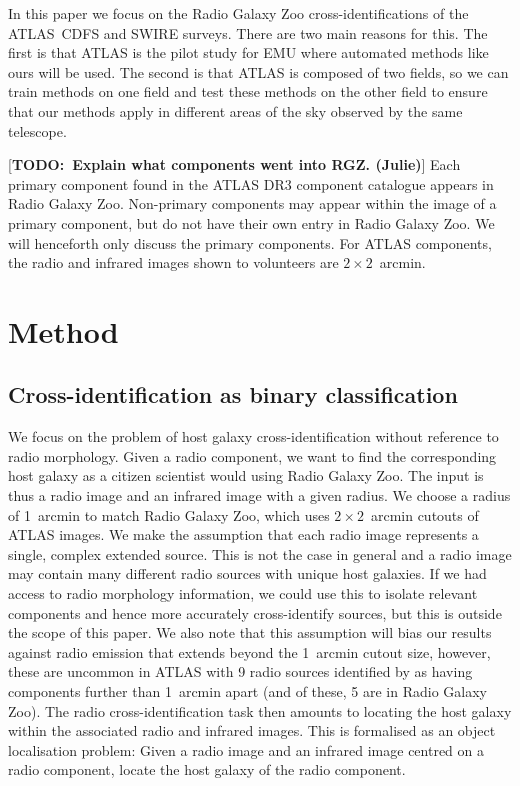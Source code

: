 \documentclass[fleqn,usenatbib,usedcolumn]{mnras}
\newcommand{\todo}[1]{ {\color{red}[{\bf TODO:~{#1}}]} }
\begin{document}
    In this paper we focus on the Radio Galaxy Zoo cross-identifications of
    the ATLAS~CDFS and SWIRE surveys. There are two main reasons for this. The
    first is that ATLAS is the pilot study for EMU where automated methods
    like ours will be used. The second is that ATLAS is composed of two
    fields, so we can train methods on one field and test these methods on
    the other field to ensure that our methods apply in different areas of
    the sky observed by the same telescope.

    \todo{Explain what components went into RGZ. (Julie)} Each primary component
    found in the ATLAS DR3 component catalogue appears in Radio Galaxy Zoo.
    Non-primary components may appear within the image of a primary component,
    but do not have their own entry in Radio Galaxy Zoo. We will henceforth only
    discuss the primary components. For ATLAS components, the radio and infrared
    images shown to volunteers are $2 \times 2$~arcmin.

  \section{Method}\label{method}

  \subsection{Cross-identification as binary
  classification}\label{cross-identification-as-binary-classification}

    We focus on the problem of host galaxy cross-identification without
    reference to radio morphology. Given a radio component, we want to find the
    corresponding host galaxy as a citizen scientist would using Radio Galaxy
    Zoo. The input is thus a radio image and an infrared image with a given
    radius. We choose a radius of 1~arcmin to match Radio Galaxy Zoo, which uses
    $2 \times 2$~arcmin cutouts of ATLAS images. We make the assumption that
    each radio image represents a single, complex extended source. This is not
    the case in general and a radio image may contain many different radio
    sources with unique host galaxies. If we had access to radio morphology
    information, we could use this to isolate relevant components and hence more
    accurately cross-identify sources, but this is outside the scope of this
    paper. We also note that this assumption will bias our results against radio
    emission that extends beyond the 1~arcmin cutout size, however, these are
    uncommon in ATLAS with 9 radio sources identified by \citet{norris06} as
    having components further than 1~arcmin apart (and of these, 5 are in Radio
    Galaxy Zoo). The radio cross-identification task then amounts to locating
    the host galaxy within the associated radio and infrared images. This is
    formalised as an object localisation problem: Given a radio image and an
    infrared image centred on a radio component, locate the host galaxy of the
    radio component.    %
\end{document}
